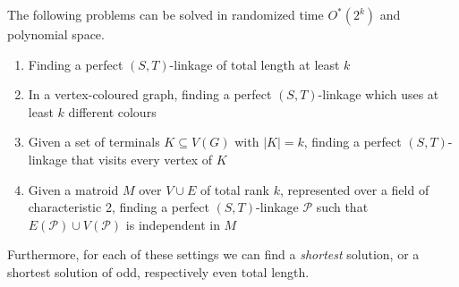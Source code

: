 \documentclass{theoretics}
\newcommand{\cP}{\ensuremath{\mathcal P}\xspace}
\begin{document}
\begin{corollary}
  \label{cor:framework-linkage}
  The following problems can be solved in randomized time $O^*(2^k)$
  and polynomial space. 
  \begin{enumerate}
  \item Finding a perfect $(S,T)$-linkage of total length at least $k$
  \item In a vertex-coloured graph, finding a perfect $(S,T)$-linkage
    which uses at least $k$ different colours
  \item Given a set of terminals $K \subseteq V(G)$ with $|K|=k$, 
    finding a perfect $(S,T)$-linkage that visits every vertex of $K$
  \item Given a matroid $M$ over $V \cup E$ of total rank $k$,
    represented over a field of characteristic 2, 
    finding a perfect $(S,T)$-linkage $\cP$ such that $E(\cP) \cup
    V(\cP)$ is independent in $M$
  \end{enumerate}
  Furthermore, for each of these settings we can find a
  \emph{shortest} solution, or a shortest solution of odd,
  respectively even total length. 
\end{corollary}
\end{document}
